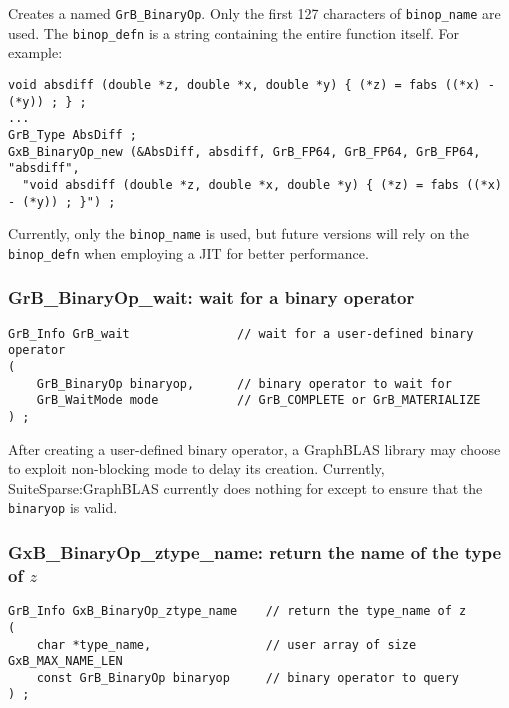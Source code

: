 \documentclass[12pt]{article}
\begin{document}
{Creates a named \verb'GrB_BinaryOp'.  Only the first 127 characters of
\verb'binop_name' are used.  The \verb'binop_defn' is a string containing the
entire function itself.  For example:

{\footnotesize
\begin{verbatim}
void absdiff (double *z, double *x, double *y) { (*z) = fabs ((*x) - (*y)) ; } ;
...
GrB_Type AbsDiff ;
GxB_BinaryOp_new (&AbsDiff, absdiff, GrB_FP64, GrB_FP64, GrB_FP64, "absdiff",
  "void absdiff (double *z, double *x, double *y) { (*z) = fabs ((*x) - (*y)) ; }") ; \end{verbatim}}

Currently, only the \verb'binop_name' is used, but future versions will
rely on the \verb'binop_defn' when employing a JIT for better performance.

\newpage
\subsubsection{{\sf GrB\_BinaryOp\_wait:} wait for a binary operator}
\label{binaryop_wait}

\begin{mdframed}[userdefinedwidth=6in]
{\footnotesize
\begin{verbatim}
GrB_Info GrB_wait               // wait for a user-defined binary operator
(
    GrB_BinaryOp binaryop,      // binary operator to wait for
    GrB_WaitMode mode           // GrB_COMPLETE or GrB_MATERIALIZE
) ;
\end{verbatim}
}\end{mdframed}

After creating a user-defined binary operator, a GraphBLAS library may choose
to exploit non-blocking mode to delay its creation.  Currently,
SuiteSparse:GraphBLAS currently does nothing for except to ensure that the
\verb'binaryop' is valid.

\subsubsection{{\sf GxB\_BinaryOp\_ztype\_name:} return the name of the type of $z$}
\label{binaryop_ztype_name}

\begin{mdframed}[userdefinedwidth=6in]
{\footnotesize
\begin{verbatim}
GrB_Info GxB_BinaryOp_ztype_name    // return the type_name of z
(
    char *type_name,                // user array of size GxB_MAX_NAME_LEN
    const GrB_BinaryOp binaryop     // binary operator to query
) ;
\end{verbatim}
} \end{mdframed}

}
\end{document}
